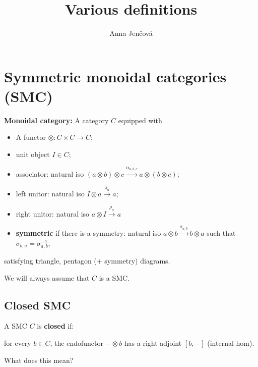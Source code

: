 \documentclass[12pt]{article}
\title{Various definitions}
\author{Anna Jen\v cov\'a}
\theoremstyle{definition}
\theoremstyle{remark}
\begin{document}
\maketitle

\section{Symmetric monoidal categories (SMC)}

 \textbf{Monoidal category:} A category $C$ equipped with
\begin{itemize}
\item A functor $\otimes: C\times C\to C$;
\item unit object $I\in C$;
\item associator: natural iso $(a\otimes b)\otimes c \xrightarrow{\alpha_{a,b,c}} a\otimes
(b\otimes c)$;
\item left unitor: natural iso $I\otimes a \xrightarrow{\lambda_a} a$;


\item right unitor: natural iso $a\otimes I \xrightarrow{\rho_a} a$

\item \textbf{symmetric} if there is a symmetry: natural iso $a\otimes
b\xrightarrow{\sigma_{a,b}} b\otimes a$ such that $\sigma_{b,a}=\sigma_{a,b}^{-1}$, 

\end{itemize}
satisfying triangle, pentagon (+ symmetry) diagrams.

\medskip

We will always assume that $C$ is a SMC.


\subsection{Closed SMC}

A SMC $C$ is \textbf{closed} if:

\medskip %
for every $b\in C$, the endofunctor $-\otimes b$ has a
right adjoint $[b,-]$ (internal hom). 

\medskip
\noindent
What does this mean?
\end{document}
